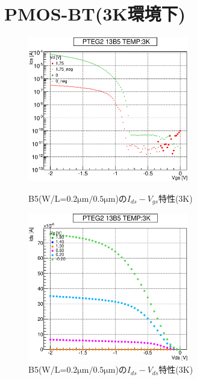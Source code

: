 		\section{PMOS-BT(3K環境下)}
				\begin{figure}[htbp]
					\begin{minipage}{0.5\hsize}
						\begin{center}
							\includegraphics[width=70mm]{./Chapter/Appendix/Picture/PBT/B5/PTEG2_13_B5_IdVg_3K.eps}
						\end{center}
						\caption{B5(W/L=$0.2\mathrm{\mu m}/0.5\mathrm{\mu m}$)の$I_{ds}-V_{gs}$特性(3K)}
						\label{fig:B5_IdVg_3K}
					\end{minipage}
					\begin{minipage}{0.5\hsize}
						\begin{center}
							\includegraphics[width=70mm]{./Chapter/Appendix/Picture/PBT/B5/PTEG2_13_B5_IdVd_3K.eps}
						\end{center}
						\caption{B5(W/L=$0.2\mathrm{\mu m}/0.5\mathrm{\mu m}$)の$I_{ds}-V_{ds}$特性(3K)}
						\label{fig:B5_IdVd_3K}
					\end{minipage}
				\end{figure}
